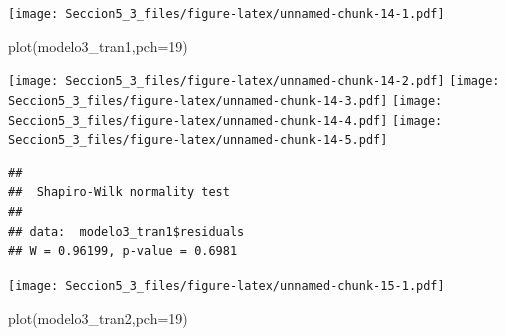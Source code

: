 \documentclass[
]{article}
\newenvironment{Shaded}{\begin{snugshade}}{\end{snugshade}}
\newcommand{\AttributeTok}[1]{\textcolor[rgb]{0.77,0.63,0.00}{#1}}
\newcommand{\DecValTok}[1]{\textcolor[rgb]{0.00,0.00,0.81}{#1}}
\newcommand{\FunctionTok}[1]{\textcolor[rgb]{0.00,0.00,0.00}{#1}}
\newcommand{\NormalTok}[1]{#1}
\newcommand{\OtherTok}[1]{\textcolor[rgb]{0.56,0.35,0.01}{#1}}
\newcommand{\SpecialCharTok}[1]{\textcolor[rgb]{0.00,0.00,0.00}{#1}}
\newcommand{\StringTok}[1]{\textcolor[rgb]{0.31,0.60,0.02}{#1}}
\begin{document}
\texttt{[image: Seccion5\_3\_files/figure-latex/unnamed-chunk-14-1.pdf]}

\begin{Shaded}
\begin{Highlighting}[]
\FunctionTok{plot}\NormalTok{(modelo3\_tran1,}\AttributeTok{pch=}\DecValTok{19}\NormalTok{)}
\end{Highlighting}
\end{Shaded}

\texttt{[image: Seccion5\_3\_files/figure-latex/unnamed-chunk-14-2.pdf]}
\texttt{[image: Seccion5\_3\_files/figure-latex/unnamed-chunk-14-3.pdf]}
\texttt{[image: Seccion5\_3\_files/figure-latex/unnamed-chunk-14-4.pdf]}
\texttt{[image: Seccion5\_3\_files/figure-latex/unnamed-chunk-14-5.pdf]}

\begin{Shaded}
\end{Shaded}

\begin{verbatim}
## 
##  Shapiro-Wilk normality test
## 
## data:  modelo3_tran1$residuals
## W = 0.96199, p-value = 0.6981
\end{verbatim}

\begin{Shaded}
\end{Shaded}

\texttt{[image: Seccion5\_3\_files/figure-latex/unnamed-chunk-15-1.pdf]}

\begin{Shaded}
\begin{Highlighting}[]
\FunctionTok{plot}\NormalTok{(modelo3\_tran2,}\AttributeTok{pch=}\DecValTok{19}\NormalTok{)}
\end{Highlighting}
\end{Shaded}
\end{document}
